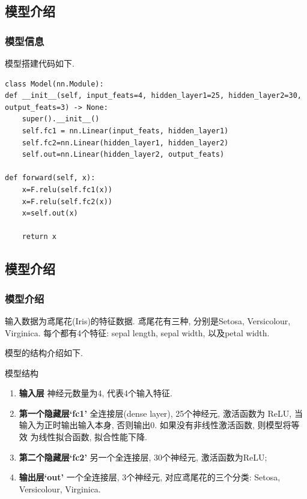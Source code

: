 \documentclass{beamer}
\begin{document}
\subsection{模型介绍}
\begin{frame}[fragile]
	\frametitle{模型信息}
	模型搭建代码如下.
	\begin{verbatim}
class Model(nn.Module):
def __init__(self, input_feats=4, hidden_layer1=25, hidden_layer2=30, output_feats=3) -> None:
	super().__init__()
	self.fc1 = nn.Linear(input_feats, hidden_layer1)
	self.fc2=nn.Linear(hidden_layer1, hidden_layer2)
	self.out=nn.Linear(hidden_layer2, output_feats)

def forward(self, x):
	x=F.relu(self.fc1(x))
	x=F.relu(self.fc2(x))
	x=self.out(x)

	return x
	\end{verbatim}
\end{frame}

\subsection{模型介绍}
\begin{frame}
	\frametitle{模型介绍}

	输入数据为鸢尾花(Iris)的特征数据. 鸢尾花有三种, 分别是Setosa, Versicolour,
	Virginica. 每个都有4个特征: sepal length, sepal width, 以及petal width.

	模型的结构介绍如下.
	\begin{block}{模型结构}
		\begin{enumerate}
			\item \textbf{输入层} 神经元数量为4, 代表4个输入特征.
			\item \textbf{第一个隐藏层`fc1'} 全连接层(dense layer), 25个神经元, 激活函数为
			      ReLU, 当输入为正时输出输入本身, 否则输出0. 如果没有非线性激活函数, 则模型将等效
			      为线性拟合函数, 拟合性能下降.
			\item \textbf{第二个隐藏层`fc2'} 另一个全连接层, 30个神经元, 激活函数为ReLU;
			\item \textbf{输出层`out'} 一个全连接层, 3个神经元, 对应鸢尾花的三个分类:
			      Setosa, Versicolour, Virginica.
		\end{enumerate}
	\end{block}

\end{frame}
\end{document}
